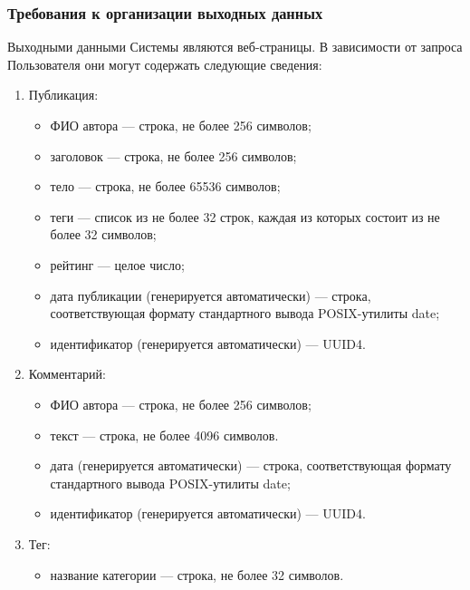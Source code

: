 \documentclass{bmstu-gost-7-32}
\begin{document}
\subsubsection{Требования к организации выходных данных}

Выходными данными Системы являются веб-страницы.
В зависимости от запроса Пользователя они могут содержать следующие сведения:

\begin{enumerate}
	\item Публикация:
	\begin{itemize}
		\item ФИО автора — строка, не более 256 символов;
		\item заголовок — строка, не более 256 символов;
		\item тело — строка, не более 65536 символов;
		\item теги — список из не более 32 строк, каждая из которых состоит из не более 32 символов;
		\item рейтинг — целое число;
		\item дата публикации (генерируется автоматически) — строка, соответствующая формату стандартного вывода POSIX-утилиты date;
		\item идентификатор (генерируется автоматически) — UUID4.
	\end{itemize}
	\item Комментарий:
	\begin{itemize}
		\item ФИО автора — строка, не более 256 символов;
		\item текст — строка, не более 4096 символов.
		\item дата (генерируется автоматически) — строка, соответствующая формату стандартного вывода POSIX-утилиты date;
		\item идентификатор (генерируется автоматически) — UUID4.
	\end{itemize}
	\item Тег:
	\begin{itemize}
		\item название категории — строка, не более 32 символов.
	\end{itemize}

\end{enumerate}
\end{document}
